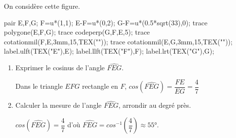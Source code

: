     On considère cette figure.
    \begin{center}
        \begin{Geometrie}
            pair E,F,G;
            F=u*(1,1);
            E-F=u*(0,2);
            G-F=u*(0.5*sqrt(33),0);
            trace polygone(E,F,G);
            trace codeperp(G,F,E,5);
            trace cotationmil(F,E,3mm,15,TEX(""));
            trace cotationmil(E,G,3mm,15,TEX(""));
            label.ulft(TEX("E"),E);
            label.llft(TEX("F"),F);
            label.lrt(TEX("G"),G);
        \end{Geometrie}
    \end{center}
    \begin{enumerate}
        \item Exprimer le cosinus de l'angle $\widehat{FEG}$.

        {\color{red}Dans le triangle $EFG$ rectangle en $F$, $cos(\widehat{FEG})=\dfrac{FE}{EG}=\dfrac47$}
        \item Calculer la mesure de l'angle $\widehat{FEG}$, arrondir au degré près.

        {\color{red}$cos(\widehat{FEG})=\dfrac47$ d'où $\widehat{FEG}=cos^{-1}\left(\dfrac47\right)\approx\ang{55}$.}
    \end{enumerate}
